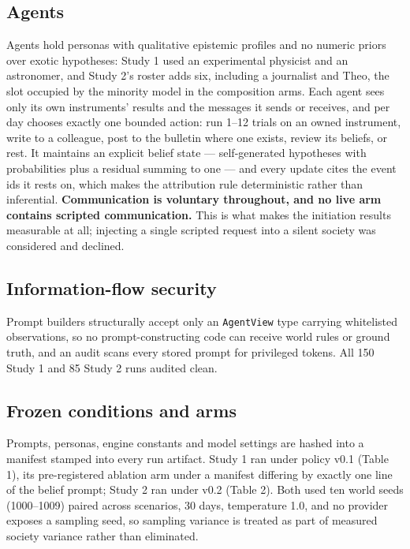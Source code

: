 \documentclass[pdflatex,sn-basic]{sn-jnl}
\begin{document}
\hypertarget{agents}{%
\subsection{Agents}\label{agents}}

Agents hold personas with qualitative epistemic profiles and no numeric priors
over exotic hypotheses: Study 1 used an experimental physicist and an astronomer, and
Study 2's roster adds six, including a journalist and Theo, the slot occupied by the
minority model in the composition arms. Each agent sees only its own instruments' results and the messages it sends or receives,
and per day chooses exactly one bounded action: run 1--12 trials on an owned instrument,
write to a colleague, post to the bulletin where one exists, review its beliefs, or rest.
It maintains an explicit belief state --- self-generated hypotheses with probabilities plus
a residual summing to one --- and every update cites the event ids it rests on, which makes
the attribution rule deterministic rather than inferential.
\textbf{Communication is voluntary throughout, and no live arm contains scripted
communication.} This is what makes the initiation results measurable at all; injecting a
single scripted request into a silent society was considered and declined.

\hypertarget{information-flow-security}{%
\subsection{Information-flow security}\label{information-flow-security}}

Prompt builders structurally accept only an \texttt{AgentView}
type carrying whitelisted observations, so no prompt-constructing code can receive world
rules or ground truth, and an audit scans every stored prompt for privileged tokens. All
150 Study 1 and 85 Study 2 runs audited clean.

\hypertarget{frozen-conditions-and-arms}{%
\subsection{Frozen conditions and arms}\label{frozen-conditions-and-arms}}

Prompts, personas, engine constants and model settings are
hashed into a manifest stamped into every run artifact. Study 1 ran under policy v0.1 (Table 1), its
pre-registered ablation arm under a manifest differing by exactly one line of the belief
prompt; Study 2 ran under v0.2 (Table 2). Both used ten world seeds (1000--1009) paired across
scenarios, 30 days, temperature 1.0, and no provider exposes a sampling seed, so sampling
variance is treated as part of measured society variance rather than eliminated.
\end{document}
